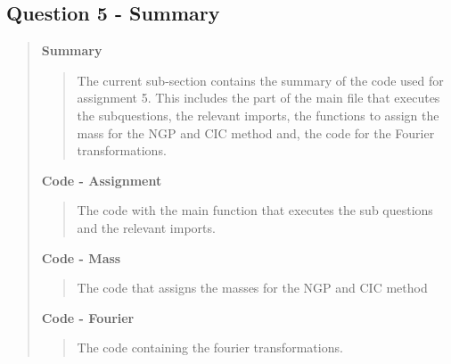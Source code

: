 
\subsection*{\textbf{Question 5 - Summary}}
\begin{quote}

\textbf{Summary}
\begin{quote}
The current sub-section contains the summary of the code used for assignment 5. This includes the part of the main file that executes the subquestions, the relevant imports, the functions to assign the mass for the NGP and CIC method and, the code for the Fourier transformations. %

\end{quote}


\textbf{Code - Assignment}

\begin{quote}
The code with the main function that executes the sub questions and the relevant imports.
\label{CODE:MAIN5}

\end{quote}

\textbf{Code - Mass} \\
\begin{quote}
The code that assigns the masses for the NGP and CIC method
\label{CODE:mass}

\end{quote}

\newpage
\textbf{Code - Fourier}
\begin{quote}
The code containing the fourier transformations.   

\label{CODE:fourier}
\end{quote}


\end{quote}


%

%


%
\newpage











